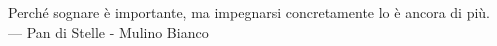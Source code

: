 
\cleardoublepage
{}
\thispagestyle{empty}

\vspace*{3cm}

\begin{center}
Perché sognare è importante, ma impegnarsi concretamente lo è ancora di più.  \\ \medskip
--- Pan di Stelle - Mulino Bianco  
\end{center}

\medskip
